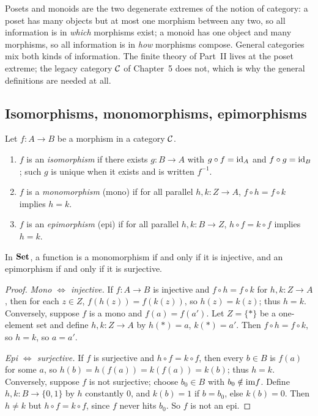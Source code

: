 Posets and monoids are the two degenerate extremes of the notion of
category: a poset has many objects but at most one morphism between any
two, so all information is in \emph{which} morphisms exist; a monoid has
one object and many morphisms, so all information is in \emph{how}
morphisms compose. General categories mix both kinds of information. The
finite theory of Part~II lives at the poset extreme; the legacy category
$\mathcal{C}$ of Chapter~5 does not, which is why the general definitions are
needed at all.

\subsection{Isomorphisms, monomorphisms, epimorphisms}\label{ch02:sec:special-morphisms}

\begin{definition}\label{ch02:def:iso-mono-epi}
Let $f : A \to B$ be a morphism in a category $\mathcal{C}$.
\begin{enumerate}
\item $f$ is an \emph{isomorphism} if there exists $g : B \to A$ with
$g \circ f = \mathrm{id}_A$ and $f \circ g = \mathrm{id}_B$; such $g$ is unique when it
exists and is written $f^{-1}$.
\item $f$ is a \emph{monomorphism} (mono) if for all parallel
$h, k : Z \to A$, $f \circ h = f \circ k$ implies $h = k$.
\item $f$ is an \emph{epimorphism} (epi) if for all parallel
$h, k : B \to Z$, $h \circ f = k \circ f$ implies $h = k$.
\end{enumerate}
\end{definition}

\begin{proposition}\label{ch02:prop:set-mono-epi}
In $\mathbf{Set}$, a function is a monomorphism if and only if it is injective,
and an epimorphism if and only if it is surjective.
\end{proposition}

\begin{proof}
\emph{Mono $\Leftrightarrow$ injective.} If $f : A \to B$ is injective
and $f \circ h = f \circ k$ for $h, k : Z \to A$, then for each
$z \in Z$, $f(h(z)) = f(k(z))$, so $h(z) = k(z)$; thus $h = k$.
Conversely, suppose $f$ is a mono and $f(a) = f(a')$. Let
$Z = \{\ast\}$ be a one-element set and define $h, k : Z \to A$ by
$h(\ast) = a$, $k(\ast) = a'$. Then $f \circ h = f \circ k$, so
$h = k$, so $a = a'$.

\emph{Epi $\Leftrightarrow$ surjective.} If $f$ is surjective and
$h \circ f = k \circ f$, then every $b \in B$ is $f(a)$ for some $a$, so
$h(b) = h(f(a)) = k(f(a)) = k(b)$; thus $h = k$. Conversely, suppose $f$
is not surjective; choose $b_0 \in B$ with $b_0 \notin \mathrm{im} f$. Define
$h, k : B \to \{0, 1\}$ by $h$ constantly $0$, and $k(b) = 1$ if
$b = b_0$, else $k(b) = 0$. Then $h \ne k$ but $h \circ f = k \circ f$,
since $f$ never hits $b_0$. So $f$ is not an epi.
\end{proof}

